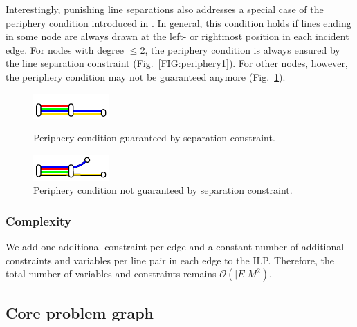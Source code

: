 \documentclass{llncs}
\begin{document}
Interestingly, punishing line separations also addresses a special case of the periphery condition introduced in \cite{asq08}. In general, this condition holds if lines ending in some node are always drawn at the left- or rightmost position in each incident edge. For nodes with degree $\leq 2$, the periphery condition is always ensured by the line separation constraint (Fig.~\ref{FIG:periphery1}). For other nodes, however, the periphery condition may not be guaranteed anymore (Fig.~\ref{FIG:periphery2}).

\begin{figure}
\centering
\begin{minipage}{.48\textwidth}
  \centering
	\includegraphics[trim={0 1.22 0 0},clip,width=.7\textwidth]{render_examples/periphery/periphery_example1.pdf}
	\caption{Periphery condition guaranteed by separation constraint.}
	\label{FIG:periphery1}
\end{minipage}%
\hfill
\begin{minipage}{.48\textwidth}
  \centering
	\includegraphics[trim={0 1.75 0 0},clip,width=.7\textwidth]{render_examples/periphery/periphery_example2.pdf}
	\caption{Periphery condition not guaranteed by separation constraint.}
	\label{FIG:periphery2}
\end{minipage}
\end{figure}

\subsubsection{Complexity}
We add one additional constraint per edge and a constant number of additional constraints and variables per line pair in each edge to the ILP.
Therefore, the total number of variables and constraints remains $\mathcal{O}(|E|M^2)$.

%
\subsection{Core problem graph}\label{SEC:coreprobgraph}
%
\end{document}
